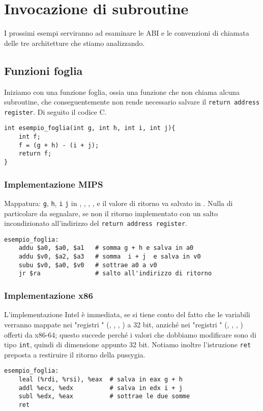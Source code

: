 \documentclass[class=book, crop=false, oneside]{standalone}
\begin{document}
\section{Invocazione di subroutine}
I prossimi esempi serviranno ad esaminare le ABI e le convenzioni di chiamata delle tre architetture che stiamo analizzando.
\subsection*{Funzioni foglia}
Iniziamo con una funzione foglia, ossia una funzione che non chiama alcuna subroutine, che conseguentemente non rende necessario salvare il \texttt{return address register}. Di seguito il codice C.
\begin{verbatim}
int esempio_foglia(int g, int h, int i, int j){
	int f;
	f = (g + h) - (i + j);
	return f;
}
\end{verbatim}

\subsubsection{Implementazione MIPS}
Mappatura: \texttt{g}, \texttt{h}, \texttt{i} \texttt{j} in , , , , e il valore di ritorno va salvato in . Nulla di particolare da segnalare, se non il ritorno implementato con un salto incondizionato all'indirizzo del \texttt{return address register}.
\begin{verbatim}
esempio_foglia:
	addu $a0, $a0, $a1	 # somma g + h e salva in a0
	addu $v0, $a2, $a3	 # somma  i + j  e salva in v0
	subu $v0, $a0, $v0	 # sottrae a0 a v0
	jr $ra	             # salto all'indirizzo di ritorno
\end{verbatim}

\subsubsection{Implementazione x86}
L'implementazione Intel è immediata, se si tiene conto del fatto che le variabili verranno mappate nei "registri " (, , , ) a 32 bit, anziché nei "registri " (, , , ) offerti da x86-64; questo succede perché i valori che dobbiamo modificare sono di tipo \texttt{int}, quindi di dimensione appunto 32 bit. Notiamo inoltre l'istruzione \texttt{ret} preposta a restiruire il ritorno della pussygia.
\begin{verbatim}
esempio_foglia:
	leal (%rdi, %rsi), %eax	 # salva in eax g + h
	addl %ecx, %edx	         # salva in edx i + j
	subl %edx, %eax	         # sottrae le due somme
	ret
\end{verbatim}
\end{document}
